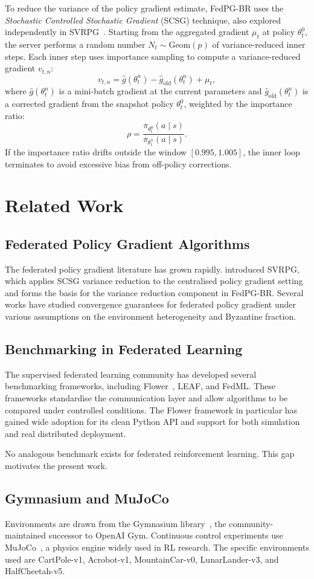 To reduce the variance of the policy gradient estimate, FedPG-BR uses the
\emph{Stochastic Controlled Stochastic Gradient} (SCSG) technique, also
explored independently in SVRPG~\cite{papini2018svrpg}. Starting from the
aggregated gradient $\mu_t$ at policy $\theta_t^0$, the server performs a
random number $N_t \sim \mathrm{Geom}(p)$ of variance-reduced inner steps.
Each inner step uses importance sampling to compute a variance-reduced
gradient $v_{t,n}$:
\[
    v_{t,n} = \hat{g}(\theta_t^n) - \hat{g}_{\text{old}}(\theta_t^n) + \mu_t,
\]
where $\hat{g}(\theta_t^n)$ is a mini-batch gradient at the current parameters
and $\hat{g}_{\text{old}}(\theta_t^n)$ is a corrected gradient from the
snapshot policy $\theta_t^0$, weighted by the importance ratio:
\[
    \rho = \frac{\pi_{\theta_t^0}(a \mid s)}{\pi_{\theta_t^n}(a \mid s)}.
\]
If the importance ratio drifts outside the window $[0.995, 1.005]$, the inner
loop terminates to avoid excessive bias from off-policy corrections.

\section{Related Work}

\subsection{Federated Policy Gradient Algorithms}

The federated policy gradient literature has grown rapidly. \cite{papini2018svrpg}
introduced SVRPG, which applies SCSG variance reduction to the centralised
policy gradient setting and forms the basis for the variance reduction component
in FedPG-BR. Several works have studied convergence guarantees for federated
policy gradient under various assumptions on the environment heterogeneity and
Byzantine fraction.

\subsection{Benchmarking in Federated Learning}

The supervised federated learning community has developed several benchmarking
frameworks, including Flower~\cite{beutel2020flower}, LEAF, and FedML. These
frameworks standardise the communication layer and allow algorithms to be
compared under controlled conditions. The Flower framework in particular has
gained wide adoption for its clean Python API and support for both simulation
and real distributed deployment.

No analogous benchmark exists for federated reinforcement learning. This gap
motivates the present work.

\subsection{Gymnasium and MuJoCo}

Environments are drawn from the Gymnasium library~\cite{brockman2016gym}, the
community-maintained successor to OpenAI Gym. Continuous control experiments
use MuJoCo~\cite{todorov2012mujoco}, a physics engine widely used in RL
research. The specific environments used are CartPole-v1, Acrobot-v1,
MountainCar-v0, LunarLander-v3, and HalfCheetah-v5.
